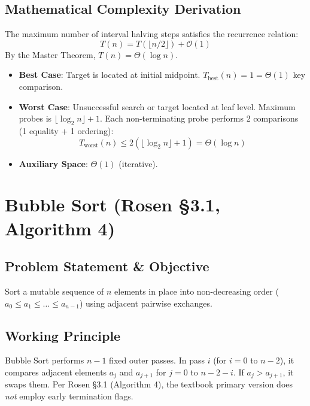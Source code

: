 \subsection{Mathematical Complexity Derivation}
The maximum number of interval halving steps satisfies the recurrence relation:
$$T(n) = T(\lfloor n/2 \rfloor) + \mathcal{O}(1)$$
By the Master Theorem, $T(n) = \Theta(\log n)$.
\begin{itemize}
    \item \textbf{Best Case}: Target is located at initial midpoint. $T_{\text{best}}(n) = 1 = \Theta(1)$ key comparison.
    \item \textbf{Worst Case}: Unsuccessful search or target located at leaf level. Maximum probes is $\lfloor \log_2 n \rfloor + 1$. Each non-terminating probe performs 2 comparisons (1 equality + 1 ordering):
    $$T_{\text{worst}}(n) \le 2(\lfloor \log_2 n \rfloor + 1) = \Theta(\log n)$$
    \item \textbf{Auxiliary Space}: $\Theta(1)$ (iterative).
\end{itemize}

\section{Bubble Sort (Rosen §3.1, Algorithm 4)}
\label{sec:bubble_sort}

\subsection{Problem Statement \& Objective}
Sort a mutable sequence of $n$ elements in place into non-decreasing order ($a_0 \le a_1 \le \dots \le a_{n-1}$) using adjacent pairwise exchanges.

\subsection{Working Principle}
Bubble Sort performs $n - 1$ fixed outer passes. In pass $i$ (for $i = 0$ to $n - 2$), it compares adjacent elements $a_j$ and $a_{j+1}$ for $j = 0$ to $n - 2 - i$. If $a_j > a_{j+1}$, it swaps them. Per Rosen §3.1 (Algorithm 4), the textbook primary version does \emph{not} employ early termination flags.

